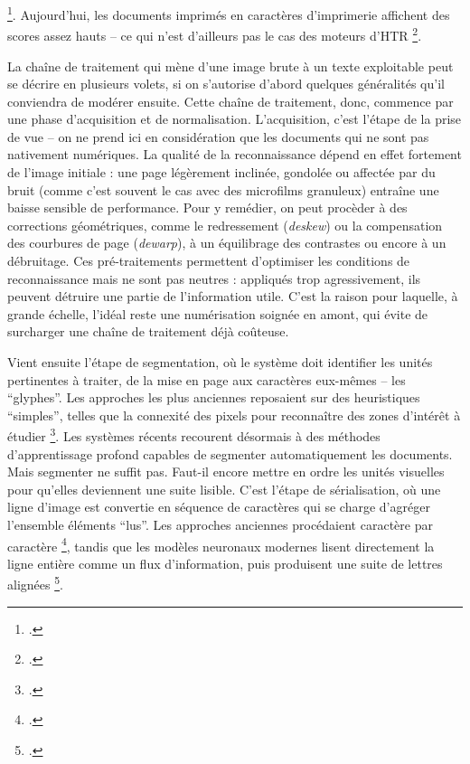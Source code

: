 \footcite[][]{bermesbook}. Aujourd'hui, les documents imprimés en caractères d'imprimerie affichent des scores assez hauts -- ce qui n'est d'ailleurs pas le cas des moteurs d'HTR \footcite[][]{chiron}.

La chaîne de traitement qui mène d’une image brute à un texte exploitable peut se décrire en plusieurs volets, si on s'autorise d'abord quelques généralités qu'il conviendra de modérer ensuite. Cette chaîne de traitement, donc, commence par une phase d’acquisition et de normalisation. L'acquisition, c'est l'étape de la prise de vue  -- on ne prend ici en considération que les documents qui ne sont pas nativement numériques. La qualité de la reconnaissance dépend en effet fortement de l’image initiale : une page légèrement inclinée, gondolée ou affectée par du bruit (comme c’est souvent le cas avec des microfilms granuleux) entraîne une baisse sensible de performance. Pour y remédier, on peut procèder à des corrections géométriques, comme le redressement (\emph{deskew}) ou la compensation des courbures de page (\emph{dewarp}), à un équilibrage des contrastes ou encore à un débruitage. Ces pré-traitements permettent d’optimiser les conditions de reconnaissance mais ne sont pas neutres : appliqués trop agressivement, ils peuvent détruire une partie de l’information utile. C’est la raison pour laquelle, à grande échelle, l’idéal reste une numérisation soignée en amont, qui évite de surcharger une chaîne de traitement déjà coûteuse.

Vient ensuite l’étape de segmentation, où le système doit identifier les unités pertinentes à traiter, de la mise en page aux caractères eux-mêmes -- les \enquote{glyphes}.  Les approches les plus anciennes reposaient sur des heuristiques \enquote{simples}, telles que  la connexité des pixels pour reconnaître des zones d'intérêt à étudier \footcite[][]{lecolinet}. Les systèmes récents recourent désormais à des méthodes d’apprentissage profond capables de segmenter automatiquement les documents. Mais segmenter ne suffit pas. Faut-il encore mettre en ordre les unités visuelles pour qu’elles deviennent une suite lisible. C’est l’étape de sérialisation, où une ligne d’image est convertie en séquence de caractères qui se charge d'agréger l'ensemble éléments \enquote{lus}. Les approches anciennes procédaient caractère par caractère \footcite[][]{lecolinet}, tandis que les modèles neuronaux modernes lisent directement la ligne entière comme un flux d’information, puis produisent une suite de lettres alignées \footcite[][]{graves}.

